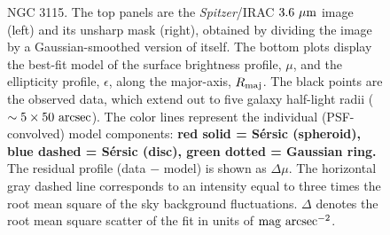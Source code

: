 \documentclass[useAMS,usenatbib,article]{mnras}
\begin{document}
\begin{figure}
\begin{center}
\caption{NGC 3115. 
The top panels are the \emph{Spitzer}/IRAC $3.6~\rm \mu m$ image (left) and its unsharp mask (right), 
obtained by dividing the image by a Gaussian-smoothed version of itself. 
The bottom plots display the best-fit model of the surface brightness profile, $\mu$, 
and the ellipticity profile, $\epsilon$, 
along the major-axis, $R_{\rm maj}$. 
The black points are the observed data, which extend out to five galaxy half-light radii ($\sim 5 \times 50~\rm arcsec$). 
The color lines represent the individual (PSF-convolved) model components: 
{\bf red solid = S\'ersic (spheroid), blue dashed = S\'ersic (disc), green dotted = Gaussian ring. }
The residual profile (data $-$ model) is shown as $\Delta \mu$. 
The horizontal gray dashed line corresponds to an intensity equal to three times the root mean square of the sky background fluctuations. 
$\Delta$ denotes the root mean square scatter of the fit in units of $\rm mag~arcsec^{-2}$. }
\label{fig:n3115}
\end{center}
\end{figure}
\end{document}
